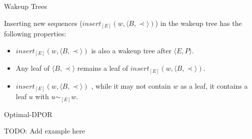 \documentclass[9pt]{beamer}
\begin{document}
\begin{frame} {Wakeup Trees}

Inserting new sequences ($insert_{[E]}(w,\langle B , \prec \rangle)$) in the wakeup tree has the following properties:

\begin{itemize}

    \item $insert_{[E]}(w,\langle B , \prec \rangle)$ is also a wakeup tree after $\langle E , P \rangle$.
    \item Any leaf of $\langle B , \prec \rangle$ remains a leaf of $insert_{[E]}(w,\langle B , \prec \rangle)$.
    \item $insert_{[E]}(w,\langle B , \prec \rangle)$ , while it may not contain $w$ as a leaf, it contains a  leaf $u$ with $u \sim_{[E]} w$. 

\end{itemize}


\end{frame}


\begin{frame} [shrink=28]{Optimal-DPOR}

\begin{algorithm}[H]
    \caption{Optimal-DPOR}
    \label{optimal}
\end{algorithm}
\end{frame}


\begin{frame} {}
  TODO: Add example here
\end{frame}
\end{document}
